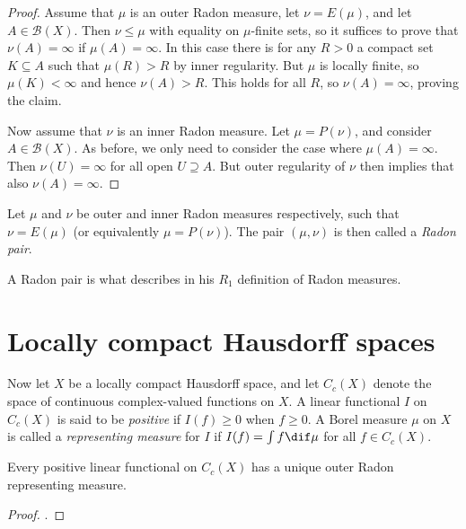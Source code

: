 \documentclass[article, a4paper, 11pt, oneside]{memoir}
\numberwithin{equation}{chapter}
\newcommand{\calB}{\mathcal{B}}
\newcommand{\borel}[1]{\calB(#1)}
\begin{document}
\begin{proof}
    Assume that $\mu$ is an outer Radon measure, let $\nu = E(\mu)$, and let $A \in \borel{X}$. Then $\nu \leq \mu$ with equality on $\mu$-finite sets, so it suffices to prove that $\nu(A) = \infty$ if $\mu(A) = \infty$. In this case there is for any $R > 0$ a compact set $K \subseteq A$ such that $\mu(R) > R$ by inner regularity. But $\mu$ is locally finite, so $\mu(K) < \infty$ and hence $\nu(A) > R$. This holds for all $R$, so $\nu(A) = \infty$, proving the claim.

    Now assume that $\nu$ is an inner Radon measure. Let $\mu = P(\nu)$, and consider $A \in \borel{X}$. As before, we only need to consider the case where $\mu(A) = \infty$. Then $\nu(U) = \infty$ for all open $U \supseteq A$. But outer regularity of $\nu$ then implies that also $\nu(A) = \infty$.
\end{proof}




\begin{definition}
    \label{def:Radon-pairs}
    Let $\mu$ and $\nu$ be outer and inner Radon measures respectively, such that $\nu = E(\mu)$ (or equivalently $\mu = P(\nu)$). The pair $(\mu,\nu)$ is then called a \emph{Radon pair}\footnotemark{}.
\end{definition}
%
A Radon pair is what \textcite{schwartz1973} describes in his $R_1$ definition of Radon measures.


\section{Locally compact Hausdorff spaces}

Now let $X$ be a locally compact Hausdorff space, and let $C_c(X)$ denote the space of continuous complex-valued functions on $X$. A linear functional $I$ on $C_c(X)$ is said to be \emph{positive} if $I(f) \geq 0$ when $f \geq 0$. A Borel measure $\mu$ on $X$ is called a \emph{representing measure} for $I$ if $I(f) = \int f \dif\mu$ for all $f \in C_c(X)$.

\begin{theorem}
    Every positive linear functional on $C_c(X)$ has a unique outer Radon representing measure.
\end{theorem}

\begin{proof}
    \textcite[Theorem~7.2]{folland2007}.
\end{proof}
\end{document}
